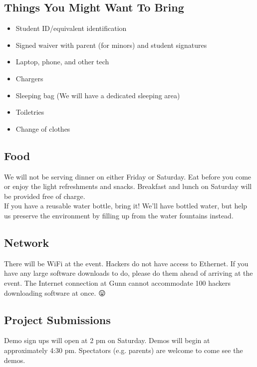 \documentclass[12pt,onesided,letterpaper]{article}
\begin{document}
\subsection*{Things You Might Want To Bring}

\begin{itemize}
\item Student ID\slash equivalent identification
\item Signed waiver with parent (for minors) and student signatures
\item Laptop, phone, and other tech
\item Chargers
\item Sleeping bag (We will have a dedicated sleeping area)
\item Toiletries
\item Change of clothes
\end{itemize}

\subsection*{Food}

We will not be serving dinner on either Friday or Saturday. Eat before you come or enjoy the light refreshments and snacks. Breakfast and lunch on Saturday will be provided free of charge.\\

If you have a reusable water bottle, bring it! We'll have bottled water, but help us preserve the environment by filling up from the water fountains instead.

\subsection*{Network}

There will be WiFi at the event. Hackers do not have access to Ethernet. If you have any large software downloads to do, please do them ahead of arriving at the event. The Internet connection at Gunn cannot accommodate 100 hackers downloading software at once. {\DejaSans 😛}

\subsection*{Project Submissions}

Demo sign ups will open at 2 pm on Saturday. Demos will begin at approximately 4:30 pm. Spectators (e.g. parents) are welcome to come see the demos.
\end{document}
